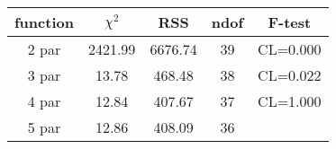\begin{tabular}{c|c|c|c|c}
function & $\chi^2$ & RSS & ndof & F-test \\
\hline
2 par & 2421.99 & 6676.74 & 39 & CL=0.000 \\
3 par & 13.78 & 468.48 & 38 & CL=0.022 \\
4 par & 12.84 & 407.67 & 37 & CL=1.000 \\
5 par & 12.86 & 408.09 & 36 & \\
\hline
\end{tabular}